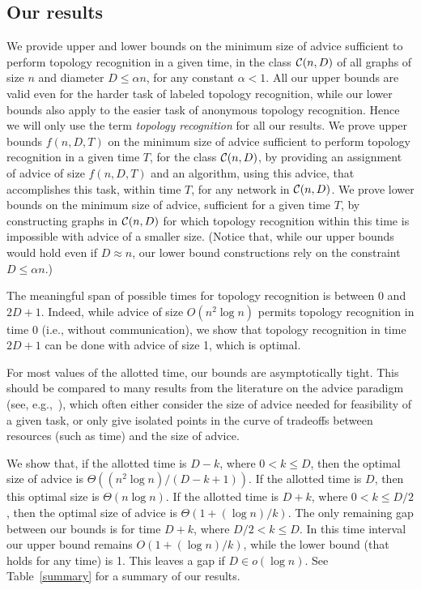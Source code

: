 \documentclass{article}
\newcommand{\cC}{{\cal C}}
\begin{document}
\subsection{Our results}
We provide upper and lower bounds on the minimum size of advice sufficient to perform topology recognition in a given time,
in the class $\cC(n,D)$ of all graphs of size $n$ and diameter $D\le \alpha n$, for any constant $\alpha< 1$.
All our upper bounds are valid even for the harder task of labeled topology recognition, while our lower bounds also apply to the easier task of anonymous topology recognition. Hence we will only use the term {\em topology recognition} for all our results.
We prove upper bounds $f(n,D,T)$ on the minimum size of advice sufficient to perform topology recognition in a given time $T$, for the class $\cC(n,D)$, by providing an assignment of advice of size $f(n,D,T)$ and an algorithm, using this advice, that accomplishes this task, within time $T$, for any network in $\cC(n,D)$.
We prove lower bounds on the minimum size of advice, sufficient for a given time $T$, by constructing graphs in $\cC(n,D)$ for which topology recognition within this time is impossible with advice of a smaller size. (Notice that, while our upper bounds would hold even if $D \approx n$, our lower bound constructions rely on the constraint $D\le \alpha n$.)

The meaningful span of possible times for topology recognition is  between 0 and 
$2D+1$. Indeed, while  advice of size $O(n^2\log n)$ permits topology recognition in time 0 (i.e., without communication), we show that topology recognition in time $2D+1$  can be done with advice of size 1, which is optimal. 

For most values of the allotted time, our bounds are asymptotically tight.
This should be compared to many results from the literature on the advice paradigm (see, e.g.,~\cite{CFIKP,FGIP,FIP1,FKL,SN}), which often either consider the size of advice  needed for feasibility of a given task, or only give isolated points in the curve 
of tradeoffs between resources (such as time) and the size of advice.

We show that, if the allotted time is $D-k$, where $0<k\le D$,  then the optimal size of advice is  $\Theta((n^2 \log n)/(D-k+1))$.
If the allotted time is $D$, then this optimal size is $\Theta(n \log n)$.
If the allotted time is $D+k$, where $0<k\le D/2$,  then the optimal size of advice is $\Theta(1+(\log n) / k)$.
The only remaining gap between our bounds is for time $D+k$,  where $D/2<k\le D$.
In this time interval our upper bound remains  $O(1+(\log n) / k)$, while the lower bound (that holds for any time) is 1. This leaves a gap  if $D\in o(\log n)$.
See Table~\ref{summary} for a summary of our results.
\end{document}
